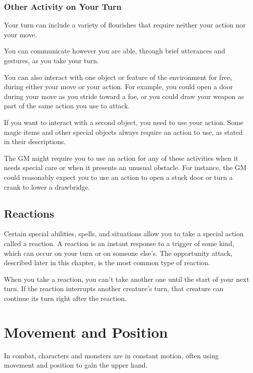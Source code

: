 \subsubsection{Other Activity on Your Turn}

Your turn can include a variety of flourishes that require neither your action nor your move.

You can communicate however you are able, through brief utterances and gestures, as you take your turn.

You can also interact with one object or feature of the environment for free, during either your move or your action. For example, you could open a door during your move as you stride toward a foe, or you could draw your weapon as part of the same action you use to attack.

If you want to interact with a second object, you need to use your action. Some magic items and other special objects always require an action to use, as stated in their descriptions.

The GM might require you to use an action for any of these activities when it needs special care or when it presents an unusual obstacle. For instance, the GM could reasonably expect you to use an action to open a stuck door or turn a crank to lower a drawbridge.

\subsection{Reactions}

Certain special abilities, spells, and situations allow you to take a special action called a reaction. A reaction is an instant response to a trigger of some kind, which can occur on your turn or on someone else's. The opportunity attack, described later in this chapter, is the most common type of reaction.

When you take a reaction, you can't take another one until the start of your next turn. If the reaction interrupts another creature's turn, that creature can continue its turn right after the reaction.

\section{Movement and Position}
\label{sec:movement-and-position}

In combat, characters and monsters are in constant motion, often using movement and position to gain the upper hand.

